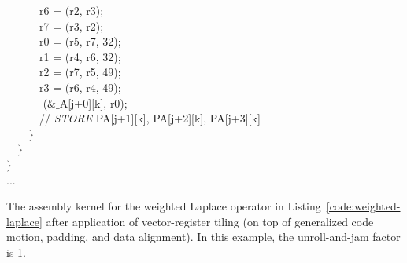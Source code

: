 \begin{algorithm}
~~~~~~r6 =  (r2, r3);\\
~~~~~~r7 =  (r3, r2);\\
~~~~~~r0 =  (r5, r7, 32);\\
~~~~~~r1 =  (r4, r6, 32);\\
~~~~~~r2 =  (r7, r5, 49);\\
~~~~~~r3 =  (r6, r4, 49);\\
~~~~~~ ($\&\_$A[j+0][k], r0);\\
~~~~~~// \emph{STORE} PA[j+1][k], PA[j+2][k], PA[j+3][k]\\
~~~~$\rbrace$\\
~~$\rbrace$\\
$\rbrace$\\
...
\caption{The assembly kernel for the weighted Laplace operator in Listing~\ref{code:weighted-laplace} after application of vector-register tiling (on top of generalized code motion, padding, and data alignment). In this example, the unroll-and-jam factor is 1.}
\label{code:weighted-laplace-opvect}
\end{algorithm}

